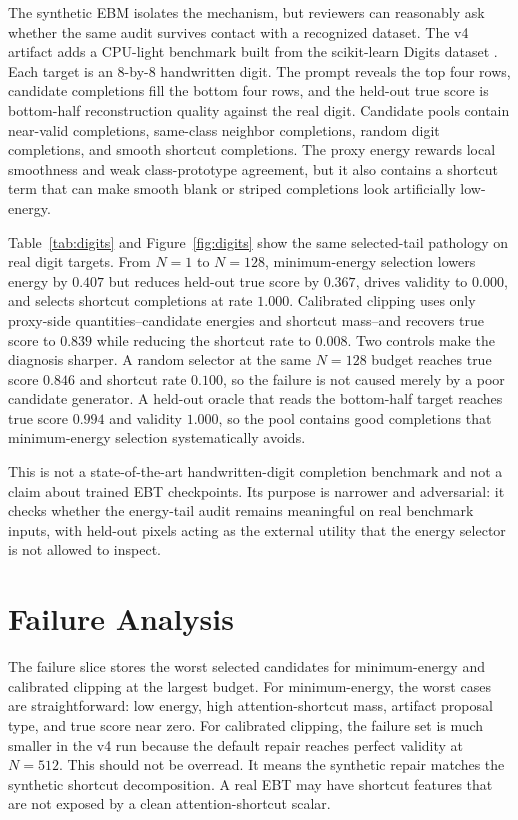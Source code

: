 \documentclass{article}
\begin{document}
The synthetic EBM isolates the mechanism, but reviewers can reasonably ask
whether the same audit survives contact with a recognized dataset. The v4
artifact adds a CPU-light benchmark built from the scikit-learn Digits dataset
\citep{pedregosa2011sklearn}. Each target is an 8-by-8 handwritten digit. The
prompt reveals the top four rows, candidate completions fill the bottom four
rows, and the held-out true score is bottom-half reconstruction quality against
the real digit. Candidate pools contain near-valid completions, same-class
neighbor completions, random digit completions, and smooth shortcut
completions. The proxy energy rewards local smoothness and weak class-prototype
agreement, but it also contains a shortcut term that can make smooth blank or
striped completions look artificially low-energy.

Table~\ref{tab:digits} and Figure~\ref{fig:digits} show the same selected-tail
pathology on real digit targets. From $N=1$ to $N=128$, minimum-energy
selection lowers energy by $0.407$ but reduces held-out true score by $0.367$,
drives validity to $0.000$, and selects shortcut completions at rate $1.000$.
Calibrated clipping uses only proxy-side quantities--candidate energies and
shortcut mass--and recovers true score to $0.839$ while reducing the shortcut
rate to $0.008$. Two controls make the diagnosis sharper. A random selector at
the same $N=128$ budget reaches true score $0.846$ and shortcut rate $0.100$,
so the failure is not caused merely by a poor candidate generator. A held-out
oracle that reads the bottom-half target reaches true score $0.994$ and
validity $1.000$, so the pool contains good completions that minimum-energy
selection systematically avoids.

This is not a state-of-the-art handwritten-digit completion benchmark and not a
claim about trained EBT checkpoints. Its purpose is narrower and adversarial:
it checks whether the energy-tail audit remains meaningful on real benchmark
inputs, with held-out pixels acting as the external utility that the energy
selector is not allowed to inspect.

\clearpage

\section{Failure Analysis}

The failure slice stores the worst selected candidates for minimum-energy and
calibrated clipping at the largest budget. For minimum-energy, the worst cases
are straightforward: low energy, high attention-shortcut mass, artifact
proposal type, and true score near zero. For calibrated clipping, the failure
set is much smaller in the v4 run because the default repair reaches perfect
validity at $N=512$. This should not be overread. It means the synthetic repair
matches the synthetic shortcut decomposition. A real EBT may have shortcut
features that are not exposed by a clean attention-shortcut scalar.
\end{document}
